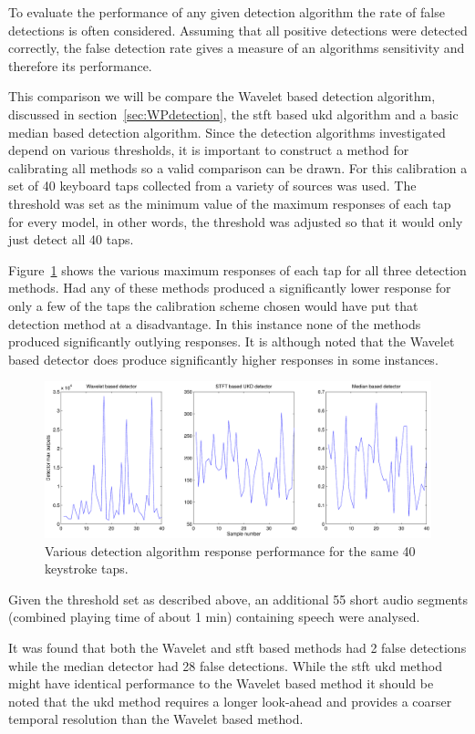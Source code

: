 To evaluate the performance of any given detection algorithm the rate of false detections is often considered. Assuming that all positive detections were detected correctly, the false detection rate gives a measure of an algorithms sensitivity and therefore its performance.

This comparison we will be compare the Wavelet based detection algorithm, discussed in section~\ref{sec:WPdetection}, the \gls{stft} based \gls{ukd} algorithm \cite{Subramanya2007} and a basic median based detection algorithm. Since the detection algorithms investigated depend on various thresholds, it is important to construct a method for calibrating all methods so a valid comparison can be drawn. For this calibration a set of 40 keyboard taps collected from a variety of sources was used. The threshold was set as the minimum value of the maximum responses of each tap for every model, in other words, the threshold was adjusted so that it would only just detect all 40 taps.

Figure~\ref{fig:maxes.pdf} shows the various maximum responses of each tap for all three detection methods. Had any of these methods produced a significantly lower response for only a few of the taps the calibration scheme chosen would have put that detection method at a disadvantage. In this instance none of the methods produced significantly outlying responses. It is although noted that the Wavelet based detector does produce significantly higher responses in some instances.

\begin{figure} %
\centering
\includegraphics[width=120mm]{maxes.pdf}
\caption{Various detection algorithm response performance for the same 40 keystroke taps.}
\label{fig:maxes.pdf}
\end{figure}

Given the threshold set as described above, an additional 55 short audio segments (combined playing time of about 1 min) containing speech were analysed.

It was found that both the Wavelet and \gls{stft} based methods had 2 false detections while the median detector had 28 false detections. While the \gls{stft} \gls{ukd} method might have identical performance to the Wavelet based method it should be noted that the \gls{ukd} method requires a longer look-ahead and provides a coarser temporal resolution than the Wavelet based method.

